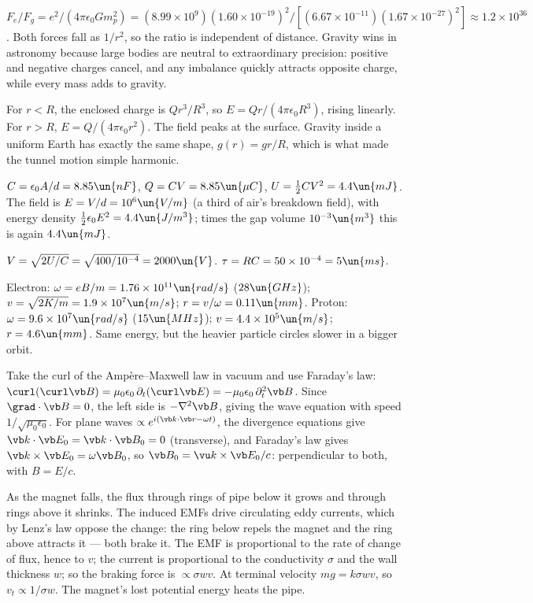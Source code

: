 
 $F_e/F_g = e^2/(4\pi\epsilon_0Gm_p^2) = (8.99\times10^9)(1.60\times10^{-19})^2/[(6.67\times10^{-11})(1.67\times10^{-27})^2]\approx1.2\times10^{36}$. Both forces fall as $1/r^2$, so the ratio is independent of distance. Gravity wins in astronomy because large bodies are neutral to extraordinary precision: positive and negative charges cancel, and any imbalance quickly attracts opposite charge, while every mass adds to gravity.

 For $r<R$, the enclosed charge is $Qr^3/R^3$, so $E = Qr/(4\pi\epsilon_0R^3)$, rising linearly. For $r>R$, $E = Q/(4\pi\epsilon_0r^2)$. The field peaks at the surface. Gravity inside a uniform Earth has exactly the same shape, $g(r) = gr/R$, which is what made the tunnel motion simple harmonic.

 $C = \epsilon_0A/d = 8.85\un{nF}$, $Q = CV = 8.85\un{\mu C}$, $U = \tfrac12CV^2 = 4.4\un{mJ}$. The field is $E = V/d = 10^6\un{V/m}$ (a third of air's breakdown field), with energy density $\tfrac12\epsilon_0E^2 = 4.4\un{J/m^3}$; times the gap volume $10^{-3}\un{m^3}$ this is again $4.4\un{mJ}$.

 $V = \sqrt{2U/C} = \sqrt{400/10^{-4}} = 2000\un{V}$. $\tau = RC = 50\times10^{-4} = 5\un{ms}$.

 Electron: $\omega = eB/m = 1.76\times10^{11}\un{rad/s}$ ($28\un{GHz}$); $v = \sqrt{2K/m} = 1.9\times10^7\un{m/s}$; $r = v/\omega = 0.11\un{mm}$. Proton: $\omega = 9.6\times10^7\un{rad/s}$ ($15\un{MHz}$); $v = 4.4\times10^5\un{m/s}$; $r = 4.6\un{mm}$. Same energy, but the heavier particle circles slower in a bigger orbit.

 Take the curl of the Amp\`ere--Maxwell law in vacuum and use Faraday's law: $\curl(\curl\vb B) = \mu_0\epsilon_0\,\partial_t(\curl\vb E) = -\mu_0\epsilon_0\,\partial_t^2\vb B$. Since $\grad\cdot\vb B = 0$, the left side is $-\nabla^2\vb B$, giving the wave equation with speed $1/\sqrt{\mu_0\epsilon_0}$. For plane waves $\propto e^{i(\vb k\cdot\vb r-\omega t)}$, the divergence equations give $\vb k\cdot\vb E_0 = \vb k\cdot\vb B_0 = 0$ (transverse), and Faraday's law gives $\vb k\times\vb E_0 = \omega\vb B_0$, so $\vb B_0 = \vu k\times\vb E_0/c$: perpendicular to both, with $B = E/c$.

 As the magnet falls, the flux through rings of pipe below it grows and through rings above it shrinks. The induced EMFs drive circulating eddy currents, which by Lenz's law oppose the change: the ring below repels the magnet and the ring above attracts it --- both brake it. The EMF is proportional to the rate of change of flux, hence to $v$; the current is proportional to the conductivity $\sigma$ and the wall thickness $w$; so the braking force is $\propto\sigma wv$. At terminal velocity $mg = k\sigma wv$, so $v_t\propto1/\sigma w$. The magnet's lost potential energy heats the pipe.

